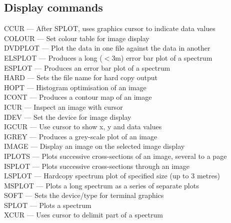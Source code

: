 \documentclass[11pt,twoside]{article}
\newcommand{\htmlref}[2]{#1}
\begin{document}

\subsection{\label{classifdisplay}Display commands}

\htmlref{CCUR}{CCUR} --- After SPLOT, uses graphics cursor to indicate data values\\
\htmlref{COLOUR}{COLOUR} --- Set colour table for image display\\
\htmlref{DVDPLOT}{DVDPLOT} --- Plot the data in one file against the data in another\\
\htmlref{ELSPLOT}{ELSPLOT} --- Produces a long ($<$3m) error bar plot of a spectrum\\
\htmlref{ESPLOT}{ESPLOT} --- Produces an error bar plot of a spectrum\\
\htmlref{HARD}{HARD} --- Sets the file name for hard copy output\\
\htmlref{HOPT}{HOPT} --- Histogram optimisation of an image\\
\htmlref{ICONT}{ICONT} --- Produces a contour map of an image\\
\htmlref{ICUR}{ICUR} --- Inspect an image with cursor\\
\htmlref{IDEV}{IDEV} --- Set the device for image display\\
\htmlref{IGCUR}{IGCUR} --- Use cursor to show x, y and data values\\
\htmlref{IGREY}{IGREY} --- Produces a grey-scale plot of an image\\
\htmlref{IMAGE}{IMAGE} --- Display an image on the selected image display\\
\htmlref{IPLOTS}{IPLOTS} --- Plots successive cross-sections of an image, several to a page\\
\htmlref{ISPLOT}{ISPLOT} --- Plots successive cross-sections through an image\\
\htmlref{LSPLOT}{LSPLOT} --- Hardcopy spectrum plot of specified size (up to 3 metres)\\
\htmlref{MSPLOT}{MSPLOT} --- Plots a long spectrum as a series of separate plots\\
\htmlref{SOFT}{SOFT} --- Sets the device/type for terminal graphics\\
\htmlref{SPLOT}{SPLOT} --- Plots a spectrum\\
\htmlref{XCUR}{XCUR} --- Uses cursor to delimit part of a spectrum
\end{document}
